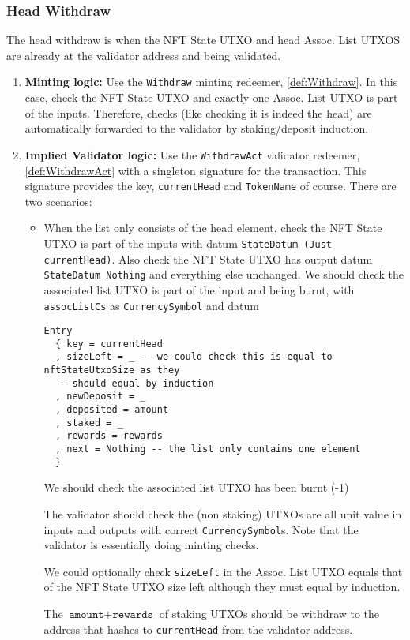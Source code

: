\documentclass[10pt, a4paper]{article}
\theoremstyle{definition}
\begin{document}
\subsubsection{Head Withdraw}\label{subsubsection:HeadWithdraw}
The head withdraw is when the NFT State UTXO and head Assoc. List UTXOS are already at the validator address and being validated.
\begin{enumerate}
\item{\textbf{Minting logic:} Use the \texttt{Withdraw} minting redeemer, \ref{def:Withdraw}. In this case, check the NFT State UTXO and exactly one Assoc. List UTXO is part of the inputs. Therefore, checks (like checking it is indeed the head) are automatically forwarded to the validator by staking/deposit induction.}
\item{\textbf{Implied Validator logic:} Use the \texttt{WithdrawAct} validator redeemer, \ref{def:WithdrawAct} with a singleton signature for the transaction. This signature provides the key, \texttt{currentHead} and \texttt{TokenName} of course. There are two scenarios:

\begin{itemize}
\item{When the list only consists of the head element, check the NFT State UTXO is part of the inputs with datum \texttt{StateDatum (Just currentHead)}. Also check the NFT State UTXO has output datum \texttt{StateDatum Nothing} and everything else unchanged. We should check the associated list UTXO is part of the input and being burnt, with \texttt{assocListCs} as \texttt{CurrencySymbol} and datum
\begin{verbatim}
Entry  
  { key = currentHead
  , sizeLeft = _ -- we could check this is equal to nftStateUtxoSize as they
  -- should equal by induction
  , newDeposit = _
  , deposited = amount
  , staked = _
  , rewards = rewards 
  , next = Nothing -- the list only contains one element
  }
\end{verbatim}

 We should check the associated list UTXO has been burnt (-1)

The validator should check the (non staking) UTXOs are all unit value in inputs and outputs with correct \texttt{CurrencySymbol}s. Note that the validator is essentially doing minting checks.

We could optionally check \texttt{sizeLeft} in the Assoc. List UTXO equals that of the NFT State UTXO size left although they must equal by induction.

The $\texttt{amount} + \texttt{rewards}$ of staking UTXOs should be withdraw to the address that hashes to \texttt{currentHead} from the validator address.
}


\end{itemize}}
\end{enumerate}
\end{document}
